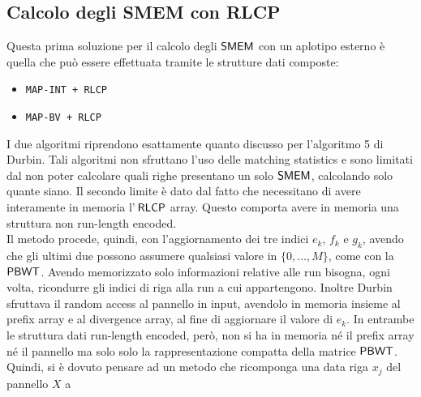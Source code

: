\subsection{Calcolo degli SMEM con RLCP}
Questa prima soluzione per il calcolo degli $\mbox{\rm {\sf SMEM}}$ con un aplotipo esterno è
quella che può essere effettuata tramite le strutture dati composte:
\begin{itemize}
  \item \texttt{MAP-INT + RLCP}
  \item \texttt{MAP-BV + RLCP}
\end{itemize}
I due algoritmi riprendono esattamente quanto discusso per l'algoritmo 5
  di Durbin. Tali algoritmi non sfruttano l'uso delle matching statistics e sono
  limitati dal non 
poter calcolare quali righe presentano un solo $\mbox{\rm {\sf SMEM}}$, calcolando solo quante
siano. Il secondo limite è dato dal fatto che necessitano di avere interamente
in memoria l'$\,\mbox{\rm {\sf RLCP}}$ array. Questo comporta avere in memoria una
struttura non run-length encoded.\\
Il metodo procede, quindi, con l'aggiornamento dei tre indici $e_k$, $f_k$ e
$g_k$, avendo che gli ultimi due possono assumere qualsiasi valore in
$\{0,\ldots, M\}$,
come con la $\mbox{\rm {\sf PBWT}}$. Avendo memorizzato solo informazioni
relative alle run bisogna, ogni volta, ricondurre gli indici di riga alla
run a cui appartengono.
Inoltre Durbin sfruttava il random access al pannello in input, avendolo in
memoria insieme al prefix array e al divergence array, al fine di aggiornare il
valore di $e_k$. In entrambe le struttura dati run-length encoded, però,
non si ha in memoria né il prefix array né il pannello ma solo solo la
rappresentazione compatta della matrice $\mbox{\rm {\sf PBWT}}$. Quindi, si è dovuto
pensare ad un metodo che ricomponga una data riga $x_j$ del pannello $X$ a
